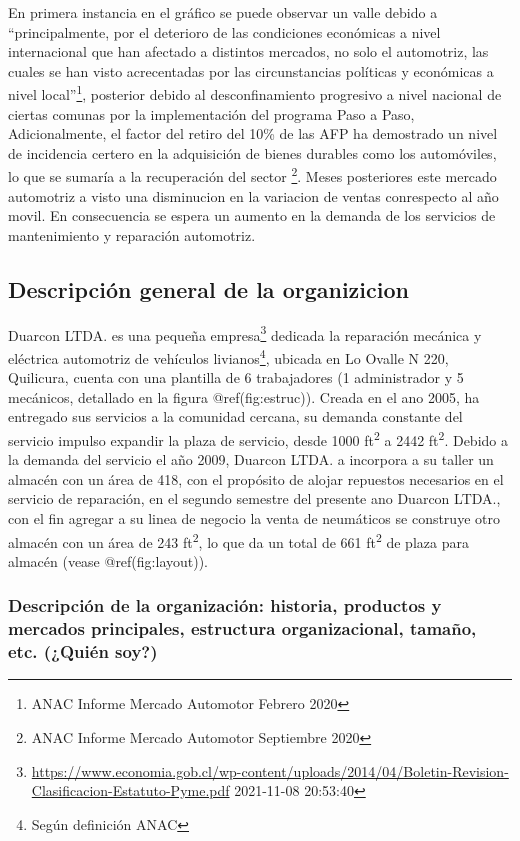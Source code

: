 \documentclass[
]{article}
\begin{document}
En primera instancia en el gráfico se puede observar un valle debido a
``principalmente, por el deterioro de las condiciones económicas a nivel
internacional que han afectado a distintos mercados, no solo el
automotriz, las cuales se han visto acrecentadas por las circunstancias
políticas y económicas a nivel local''\footnote{ANAC Informe Mercado
  Automotor Febrero 2020}, posterior debido al desconfinamiento
progresivo a nivel nacional de ciertas comunas por la implementación del
programa Paso a Paso, Adicionalmente, el factor del retiro del 10\% de
las AFP ha demostrado un nivel de incidencia certero en la adquisición
de bienes durables como los automóviles, lo que se sumaría a la
recuperación del sector \footnote{ANAC Informe Mercado Automotor
  Septiembre 2020}. Meses posteriores este mercado automotriz a visto
una disminucion en la variacion de ventas conrespecto al año movil. En
consecuencia se espera un aumento en la demanda de los servicios de
mantenimiento y reparación automotriz.

\hypertarget{descripciuxf3n-general-de-la-organizicion}{%
\subsection{Descripción general de la
organizicion}\label{descripciuxf3n-general-de-la-organizicion}}

Duarcon LTDA. es una pequeña empresa\footnote{\url{https://www.economia.gob.cl/wp-content/uploads/2014/04/Boletin-Revision-Clasificacion-Estatuto-Pyme.pdf}
  2021-11-08 20:53:40} dedicada la reparación mecánica y eléctrica
automotriz de vehículos livianos\footnote{Según definición ANAC},
ubicada en Lo Ovalle N 220, Quilicura, cuenta con una plantilla de 6
trabajadores (1 administrador y 5 mecánicos, detallado en la figura
@ref(fig:estruc)). Creada en el ano 2005, ha entregado sus servicios a
la comunidad cercana, su demanda constante del servicio impulso expandir
la plaza de servicio, desde 1000 ft\textsuperscript{2} a 2442
ft\textsuperscript{2}. Debido a la demanda del servicio el año 2009,
Duarcon LTDA. a incorpora a su taller un almacén con un área de 418, con
el propósito de alojar repuestos necesarios en el servicio de
reparación, en el segundo semestre del presente ano Duarcon LTDA., con
el fin agregar a su linea de negocio la venta de neumáticos se construye
otro almacén con un área de 243 ft\textsuperscript{2}, lo que da un
total de 661 ft\textsuperscript{2} de plaza para almacén (vease
@ref(fig:layout)).

\hypertarget{descripciuxf3n-de-la-organizaciuxf3n-historia-productos-y-mercados-principales-estructura-organizacional-tamauxf1o-etc.-quiuxe9n-soy}{%
\subsubsection{Descripción de la organización: historia, productos y
mercados principales, estructura organizacional, tamaño, etc. (¿Quién
soy?)}\label{descripciuxf3n-de-la-organizaciuxf3n-historia-productos-y-mercados-principales-estructura-organizacional-tamauxf1o-etc.-quiuxe9n-soy}}
\end{document}
